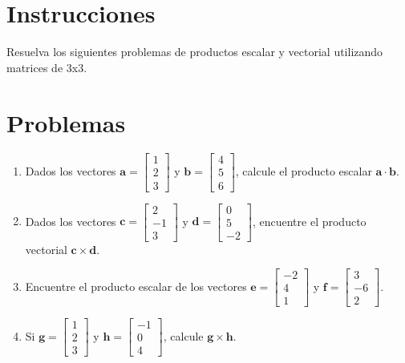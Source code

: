 \documentclass[10pt,a4paper]{article}
\begin{document}
\section*{Instrucciones}
Resuelva los siguientes problemas de productos escalar y vectorial utilizando matrices de 3x3.

\section*{Problemas}

\begin{enumerate}[resume]
    \item Dados los vectores $\mathbf{a} = \begin{bmatrix} 1 \\ 2 \\ 3 \end{bmatrix}$ y $\mathbf{b} = \begin{bmatrix} 4 \\ 5 \\ 6 \end{bmatrix}$, calcule el producto escalar $\mathbf{a} \cdot \mathbf{b}$.
    \item Dados los vectores $\mathbf{c} = \begin{bmatrix} 2 \\ -1 \\ 3 \end{bmatrix}$ y $\mathbf{d} = \begin{bmatrix} 0 \\ 5 \\ -2 \end{bmatrix}$, encuentre el producto vectorial $\mathbf{c} \times \mathbf{d}$.
    \item Encuentre el producto escalar de los vectores $\mathbf{e} = \begin{bmatrix} -2 \\ 4 \\ 1 \end{bmatrix}$ y $\mathbf{f} = \begin{bmatrix} 3 \\ -6 \\ 2 \end{bmatrix}$.
    \item Si $\mathbf{g} = \begin{bmatrix} 1 \\ 2 \\ 3 \end{bmatrix}$ y $\mathbf{h} = \begin{bmatrix} -1 \\ 0 \\ 4 \end{bmatrix}$, calcule $\mathbf{g} \times \mathbf{h}$.


\end{enumerate}
\end{document}
